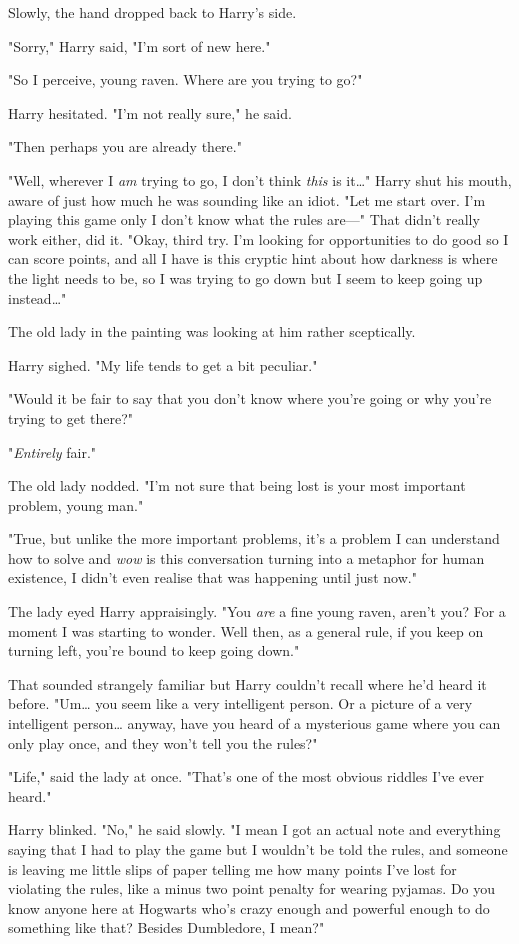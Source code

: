 Slowly, the hand dropped back to Harry's side.

"Sorry," Harry said, "I'm sort of new here."

"So I perceive, young raven. Where are you trying to go?"

Harry hesitated. "I'm not really sure," he said.

"Then perhaps you are already there."

"Well, wherever I \emph{am} trying to go, I don't think \emph{this} is 
it{\ldots}" Harry shut his mouth, aware of just how much he was sounding like 
an idiot. "Let me start over. I'm playing this game only I don't know what the 
rules are---" That didn't really work either, did it. "Okay, third try. I'm 
looking for opportunities to do good so I can score points, and all I have is 
this cryptic hint about how darkness is where the light needs to be, so I was 
trying to go down but I seem to keep going up instead{\ldots}"

The old lady in the painting was looking at him rather sceptically.

Harry sighed. "My life tends to get a bit peculiar."

"Would it be fair to say that you don't know where you're going or why you're 
trying to get there?"

"\emph{Entirely} fair."

The old lady nodded. "I'm not sure that being lost is your most important 
problem, young man."

"True, but unlike the more important problems, it's a problem I can understand 
how to solve and \emph{wow} is this conversation turning into a metaphor for 
human existence, I didn't even realise that was happening until just now."

The lady eyed Harry appraisingly. "You \emph{are} a fine young raven, aren't 
you? For a moment I was starting to wonder. Well then, as a general rule, if 
you keep on turning left, you're bound to keep going down."

That sounded strangely familiar but Harry couldn't recall where he'd heard it 
before. "Um{\ldots} you seem like a very intelligent person. Or a picture of a 
very intelligent person{\ldots} anyway, have you heard of a mysterious game 
where you can only play once, and they won't tell you the rules?"

"Life," said the lady at once. "That's one of the most obvious riddles I've 
ever heard."

Harry blinked. "No," he said slowly. "I mean I got an actual note and 
everything saying that I had to play the game but I wouldn't be told the rules, 
and someone is leaving me little slips of paper telling me how many points I've 
lost for violating the rules, like a minus two point penalty for wearing 
pyjamas. Do you know anyone here at Hogwarts who's crazy enough and powerful 
enough to do something like that? Besides Dumbledore, I mean?"

